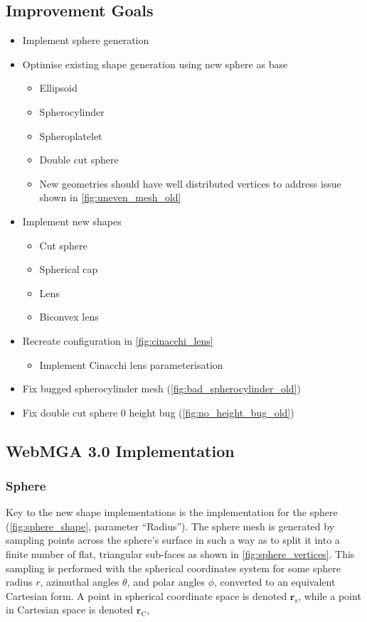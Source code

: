 \subsection{Improvement Goals}
\begin{itemize}
  \item Implement sphere generation
  \item Optimise existing shape generation using new sphere as base
    \begin{itemize}
      \item Ellipsoid
      \item Spherocylinder
      \item Spheroplatelet
      \item Double cut sphere
      \item New geometries should have well distributed vertices to address issue shown in \cref{fig:uneven_mesh_old}
    \end{itemize}
  \item Implement new shapes
    \begin{itemize}
      \item Cut sphere
      \item Spherical cap
      \item Lens
      \item Biconvex lens
    \end{itemize}
    \item Recreate configuration in \cref{fig:cinacchi_lens}
          \begin{itemize}
      \item Implement Cinacchi lens parameterisation
    \end{itemize}
    \item Fix bugged spherocylinder mesh (\cref{fig:bad_spherocylinder_old})
    \item Fix double cut sphere 0 height bug (\cref{fig:no_height_bug_old})
\end{itemize}

\subsection{WebMGA 3.0 Implementation}
\subsubsection{Sphere}
\label{sphere_gen_sec}
Key to the new shape implementations is the implementation for the sphere (\cref{fig:sphere_shape}, parameter ``Radius''). The sphere mesh is generated by sampling points across the sphere's surface in such a way as to split it into a finite number of flat, triangular sub-faces as shown in \cref{fig:sphere_vertices}. This sampling is performed with the spherical coordinates system for some sphere radius $r$, azimuthal angles $\theta$, and polar angles $\phi$, converted to an equivalent Cartesian form. A point in spherical coordinate space is denoted $\mathbf{r}_\mathrm{s}$, while a point in Cartesian space is denoted $\mathbf{r}_\mathrm{C}$,

